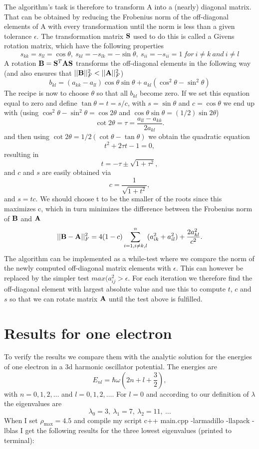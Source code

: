 \documentclass[a4paper,12pt, english]{article}
\begin{document}
The algorithm's task is therefore to transform A into a (nearly) diagonal matrix. 
That can be obtained by reducing the Frobenius norm of the off-diagonal elements of A
with every transformation until the norm is less than a given tolerance $\epsilon$. 
The transformation matrix ${\bf S}$ used to do this is called a Givens rotation matrix, which
have the following properties
\[
s_{kk} = s_{ll} = \cos\theta,\ s_{kl} = -s_{lk} = -\sin\theta,\ s_{ii} = -s_{ii} = 1\ for\  i \neq k\ and\ i \neq l
\]
A rotation ${\bf B} = {\bf S}^T {\bf A} {\bf S}$ transforms the off-diagonal elements
in the following way (and also ensures that $||{\bf B}||_F^2 < ||{\bf A}||_F^2$)
\[
b_{kl} = (a_{kk}-a_{ll}) \cos\theta \sin\theta + a_{kl}(\cos^2\theta-\sin^2\theta)
\]
The recipe is now to choose $\theta$ so that all $b_{kl}$ become zero. If we set this equation equal to zero 
and define 
$\tan\theta = t= s/c$, with $s=\sin\theta$ and $c=\cos\theta$ we end up with
(using $\cos^2\theta - \sin^2\theta = \cos2\theta$ and $\cos\theta\sin\theta = (1/2)\sin2\theta$)
\[
\cot 2\theta=\tau = \frac{a_{ll}-a_{kk}}{2a_{kl}}.
\]
and then using $\cot 2\theta=1/2(\cot \theta-\tan\theta)$ we obtain the quadratic equation
\[
t^2+2\tau t-1= 0,
\]
resulting in 
\[
  t = -\tau \pm \sqrt{1+\tau^2},
\]
and $c$ and $s$ are easily obtained via
\[
   c = \frac{1}{\sqrt{1+t^2}},
\]
and $s=tc$. We should choose t to be the smaller of the roots since this maximizes c, which in turn minimizes
the difference between the Frobenius norm of ${\bf B}$ and ${\bf A}$
\[
||{\bf B}-{\bf A}||_F^2=4(1-c)\sum_{i=1,i\ne k,l}^n(a_{ik}^2+a_{il}^2) +\frac{2a_{kl}^2}{c^2}.
\]
The algorithm can be implemented as a while-test where we compare the norm of the newly computed off-diagonal
matrix elements with $\epsilon$. This can however be replaced by the simpler test $max(a^2_{ij} > \epsilon$.
For each iteration we therefore find the off-diagonal element with largest absolute value and use this
to compute $t$, $c$ and $s$ so that we can rotate matrix ${\bf A}$ until the test above is fulfilled. 

\section*{Results for one electron}
To verify the results we compare them with the analytic solution for the energies of one electron in a 3d 
harmonic
oscillator potential. The energies are
\[
E_{nl}=  \hbar \omega \left(2n+l+\frac{3}{2}\right),
\]
with $n=0,1,2,\dots$ and $l=0,1,2,\dots$.
For $l = 0$ and according to our definition of $\lambda$ the eigenvalues are 
\[
\lambda_0=3,\ \lambda_1=7,\ \lambda_2=11,\ \dots 
\]
When I set $\rho_{\mathrm{max}} = 4.5$ and compile my script c++ main.cpp -larmadillo -llapack -lblas
I get the following results for the three lowest eigenvalues (printed to terminal):
\end{document}
